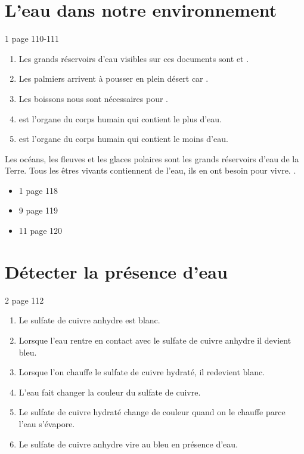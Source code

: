 \documentclass[12pt,a4paper]{article}
\date{}
\title{}
\begin{document}
	
	

\section{L'eau dans notre environnement}

\begin{myact}{1 page 110-111}
	\begin{enumerate}
		\item Les grands réservoirs d'eau visibles sur ces documents sont  et .
		\item Les palmiers arrivent à pousser en plein désert car .
		\item Les boissons nous sont nécessaires pour .
		\item {} est l'organe du corps humain qui contient le plus d'eau.
		\item {} est l'organe du corps humain qui contient le moins d'eau.
	\end{enumerate}
\end{myact}

\begin{mybilan}
	Les océans, les fleuves et les glaces polaires sont les grands réservoirs d'eau de la Terre. Tous les êtres vivants contiennent de l'eau, ils en ont besoin pour vivre. .
\end{mybilan}

\begin{myexos}
	\begin{itemize}
		\item 1 page 118
		\item 9 page 119
		\item 11 page 120
	\end{itemize}
\end{myexos}

\section{Détecter la présence d'eau}

\begin{myact}{2 page 112}
	\begin{enumerate}
		\item Le sulfate de cuivre anhydre est blanc.
		\item Lorsque l'eau rentre en contact avec le sulfate de cuivre anhydre il devient bleu.
		\item Lorsque l'on chauffe le sulfate de cuivre hydraté, il redevient blanc.
		\item L'eau fait changer la couleur du sulfate de cuivre.
		\item Le sulfate de cuivre hydraté change de couleur quand on le chauffe parce l'eau s'évapore.
		\item Le sulfate de cuivre anhydre vire au bleu en présence d'eau.
	\end{enumerate}
\end{myact}
\end{document}
